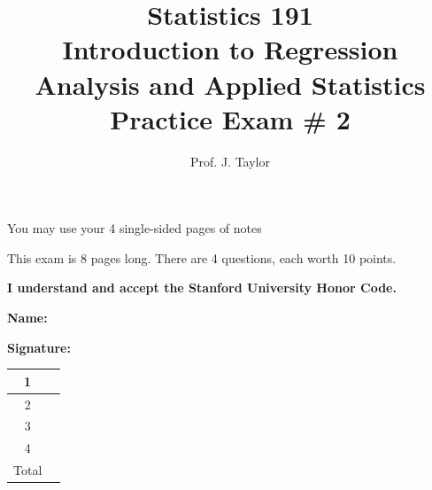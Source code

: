 \documentclass{article}
\begin{document}
\title{Statistics 191 \\ Introduction to Regression Analysis and Applied Statistics \\ Practice Exam \# 2 }
\author{Prof. J.  Taylor}
\date{}
\maketitle 

{\sc You may use your 4 single-sided pages of notes}

{\sc This exam is 8 pages long. There are 4 questions, each worth 10 points.}

\vspace{1in}


{\bf \sc I understand and accept the Stanford University Honor Code.}

\vspace{0.5in}

{\bf \sc Name:} \underline{\hspace{2.5in}}

\vspace{0.5in}

{\bf \sc Signature:} \underline{\hspace{2.5in}}

\vspace{1in}
\begin{center}
\begin{tabular}{|c|p{0.8in}|} \hline
  1 & \\ \hline
  2 & \\ \hline
  3 & \\ \hline
  4 & \\ \hline
  Total & \\ \hline
\end{tabular}
\end{center}
\end{document}
